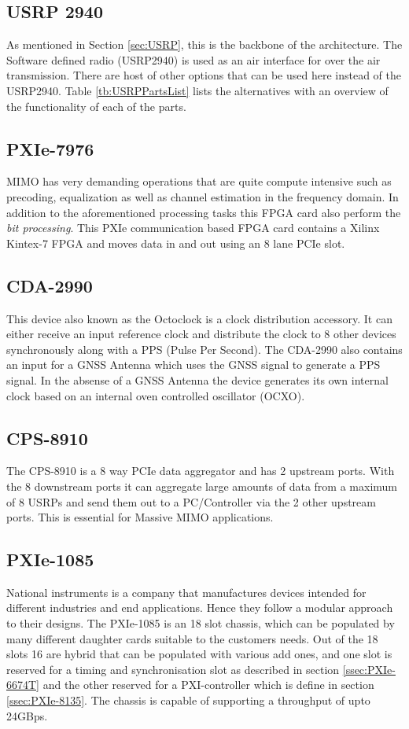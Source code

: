 \subsection{USRP 2940}\label{sec:MIMOAFWUSRP}
As mentioned in Section \ref{sec:USRP}, this is the backbone of the architecture. The Software defined radio (USRP2940) is used as an air interface for over the air transmission. There are host of other options that can be used here instead of the USRP2940. Table \ref{tb:USRPPartsList} lists the alternatives with an overview of the functionality of each of the parts.

\subsection{PXIe-7976}\label{ssec:PXIe-7976}
MIMO has very demanding operations that are quite compute intensive such as precoding, equalization as well as channel estimation in the frequency domain. In addition to the aforementioned processing tasks this FPGA card also perform the \emph{bit processing}. This PXIe communication based FPGA card contains a Xilinx Kintex-7 FPGA and moves data in and out using an 8 lane PCIe slot.

\subsection{CDA-2990}\label{ssec:CDA-2990}
This device also known as the Octoclock is a clock distribution accessory. It can either receive an input reference clock and distribute the clock to 8 other devices synchronously along with a PPS (Pulse Per Second). The CDA-2990 also contains an input for a GNSS Antenna which uses the GNSS signal to generate a PPS signal. In the absense of a GNSS Antenna the device generates its own internal clock based on an internal oven controlled oscillator (OCXO).

\subsection{CPS-8910}\label{ssec:CPS-8910}
The CPS-8910 is a 8 way PCIe data aggregator and has 2 upstream ports. With the 8 downstream ports it can aggregate large amounts of data from a maximum of 8 USRPs and send them out to a PC/Controller via the 2 other upstream ports. This is essential for Massive MIMO applications.

\subsection{PXIe-1085}\label{ssec:PXIe-1085}
National instruments is a company that manufactures devices intended for different industries and end applications. Hence they follow a modular approach to their designs. The PXIe-1085 is an 18 slot chassis, which can be populated by many different daughter cards suitable to the customers needs. Out of the 18 slots 16 are hybrid that can be populated with various add ones, and one slot is reserved for a timing and synchronisation slot as described in section \ref{ssec:PXIe-6674T} and the other reserved for a PXI-controller which is define in section \ref{ssec:PXIe-8135}. The chassis is capable of supporting a throughput of upto 24GBps.

